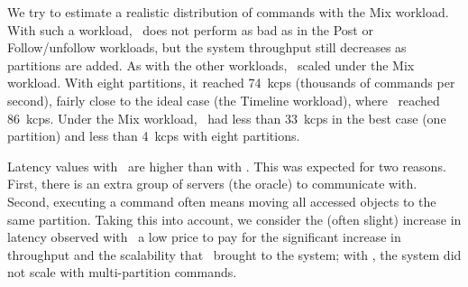 We try to estimate a realistic distribution of commands with the Mix workload.
With such a workload, \ssmr\ does not perform as bad as in the Post or Follow/unfollow workloads, but the system throughput still decreases as partitions are added.
As with the other workloads, \dssmr\ scaled under the Mix workload.
With eight partitions, it reached 74~kcps (thousands of commands per second), fairly close to the ideal case (the Timeline workload), where \dssmr\ reached 86~kcps.
Under the Mix workload, \ssmr\ had less than 33~kcps in the best case (one partition) and less than 4~kcps with eight partitions.

Latency values with \dssmr\ are higher than with \ssmr{}.
This was expected for two reasons. First, there is an extra group of servers (the oracle) to communicate with.
Second, executing a command often means moving all accessed objects to the same partition.
Taking this into account, we consider the (often slight) increase in latency observed with \dssmr\ a low price to pay for the significant increase in throughput and the scalability that \dssmr\ brought to the system; with \ssmr{}, the system did not scale with multi-partition commands.



